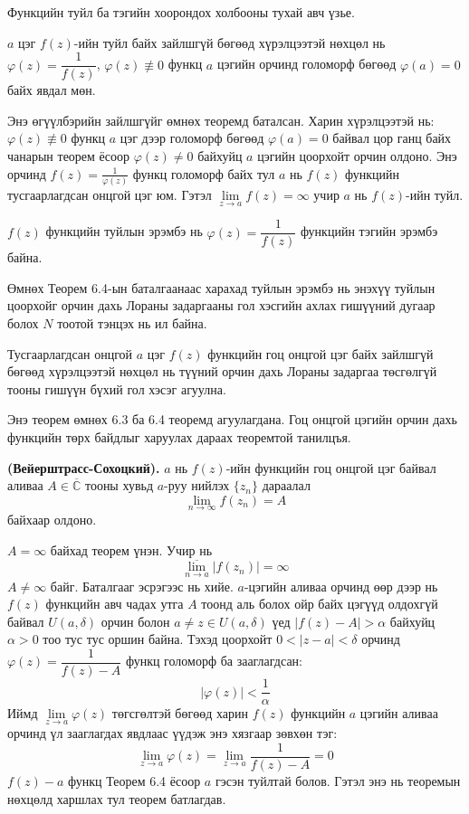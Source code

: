 Функцийн туйл ба тэгийн хоорондох холбооны тухай авч үзье.
\begin{thm}
$a$ цэг $f(z)$-ийн туйл байх зайлшгүй бөгөөд хүрэлцээтэй нөхцөл нь
 $\varphi(z)=\dfrac{1}{f(z)}$, $\varphi(z) \not \equiv  0$ функц $a$ цэгийн орчинд голоморф бөгөөд $\varphi(a)=0$ байх явдал мөн.
 \end{thm}
 \begin{prf}
 Энэ өгүүлбэрийн зайлшгүйг өмнөх теоремд баталсан. Харин хүрэлцээтэй нь: $\varphi (z)\not\equiv 0$ функц $a$ цэг дээр голоморф бөгөөд $\varphi(a)=0$ байвал цор ганц байх чанарын теорем ёсоор $\varphi(z)\neq 0$ байхуйц $a$ цэгийн цоорхойт орчин олдоно. Энэ орчинд $f(z)=\frac{1}{\varphi(z)}$ функц голоморф байх тул $a$ нь $f(z)$ функцийн тусгаарлагдсан онцгой цэг юм. Гэтэл $\lim\limits_{z\rightarrow a}f(z)=\infty$ учир $a$ нь $f(z)$-ийн туйл. 
  \end{prf}
 \begin{dfn}
 $f(z)$ функцийн туйлын эрэмбэ  нь $\varphi(z)=\dfrac{1}{f(z)}$ функцийн тэгийн эрэмбэ байна.
 
 Өмнөх Теорем 6.4-ын баталгаанаас харахад туйлын эрэмбэ нь энэхүү туйлын цоорхойг орчин дахь Лораны задаргааны гол хэсгийн ахлах гишүүний дугаар болох $N$ тоотой тэнцэх нь ил байна.
 \end{dfn}
 \begin{thm}
 Тусгаарлагдсан онцгой $a$ цэг $f(z)$ функцийн гоц онцгой цэг байх зайлшгүй бөгөөд хүрэлцээтэй нөхцөл нь түүний орчин дахь Лораны задаргаа төсгөлгүй тооны гишүүн бүхий гол хэсэг агуулна.
 \end{thm}
 \begin{prf}
 Энэ теорем өмнөх 6.3 ба 6.4 теоремд агуулагдана. Гоц онцгой цэгийн орчин дахь функцийн төрх байдлыг харуулах дараах теоремтой танилцъя. 
  \end{prf}
 \begin{thm}
 \textbf{(Вейерштрасс-Сохоцкий).}  $a$ нь $f(z)$-ийн функцийн гоц онцгой цэг байвал аливаа $A\in\overline{\mathbb{C}}$ тооны хувьд $a$-руу нийлэх $\{z_n\}$ дараалал 
 $$\lim\limits_{n\rightarrow \infty} f(z_n)=A$$ байхаар олдоно.
 \end{thm}
 \begin{prf}
 $A=\infty$ байхад теорем үнэн. Учир нь 
  $$\overline{\lim\limits_{n\rightarrow a}} |f(z_n)|=\infty$$
  $A\neq \infty$ байг. Баталгааг эсрэгээс нь хийе. $a$-цэгийн аливаа орчинд өөр дээр нь $f(z)$ функцийн авч чадах утга $A$ тоонд аль болох ойр байх цэгүүд олдохгүй байвал $U(a,\delta)$ орчин болон $a\neq z\in U(a,\delta)$ үед $|f(z)-A|>\alpha$ байхуйц $\alpha>0$ тоо тус тус оршин байна. Тэхэд цоорхойт $0<|z-a|<\delta$ орчинд $\varphi(z)=\dfrac{1}{f(z)-A}$ функц голоморф ба зааглагдсан: 
  $$|\varphi(z)|<\frac{1}{\alpha}$$
  Иймд $\lim\limits_{z\rightarrow a}\varphi(z)$ төгсгөлтэй бөгөөд харин $f(z)$ функцийн $a$ цэгийн аливаа орчинд үл зааглагдах явдлаас үүдэж энэ хязгаар зөвхөн тэг:
  $$\lim\limits_{z\rightarrow a}\varphi(z)=\lim\limits_{z\rightarrow a}\frac{1}{f(z)-A}=0$$
  $f(z)-a$ функц Теорем 6.4 ёсоор $a$ гэсэн туйлтай болов. Гэтэл энэ нь теоремын нөхцөлд харшлах тул теорем батлагдав.
  \end{prf}
 
